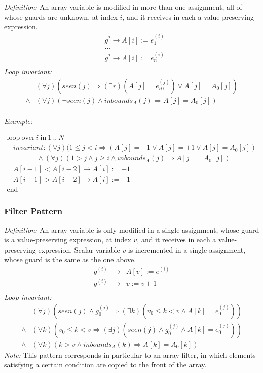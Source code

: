\documentclass[a4paper,10pt]{article}
\newcommand{\idx}{\ensuremath{i}\xspace}
\newcommand{\at}[1]{{(#1)}}
\newcommand{\KWloop}{\ensuremath{\mathrm{loop}~}}
\newcommand{\KWend}{\ensuremath{\mathrm{end}~}}
\newcommand{\KWover}{\ensuremath{\mathrm{over}~}}
\newcommand{\KWin}{\ensuremath{~\mathrm{in}~}}
\newcommand{\impl}{\ensuremath{\Longrightarrow}}
\newcommand{\inbounds}[2]{\ensuremath{\mathit{inbounds}_{#1}(#2)}\xspace}
\newcommand{\seen}[1]{\ensuremath{\mathit{seen}(#1)}\xspace}
\newcommand{\loopinvariant}{\noindent\textit{Loop invariant:}\xspace}
\newcommand{\patterndef}{\noindent\textit{Definition:}\xspace}
\newcommand{\patternexample}{\noindent\textit{Example:}\xspace}
\newcommand{\patternnote}{\noindent\textit{Note:}\xspace}
\begin{document}
\patterndef An array variable is modified in more than one assignment, all
of whose guards are unknown, at index \idx, and it receives in each a
value-preserving expression.
%
\begin{eqnarray*}
&g^? \rightarrow A[\idx] := e_1^\at{\idx}\\
&...\\
&g^? \rightarrow A[\idx] := e_n^\at{\idx}\\
\end{eqnarray*}
%
\loopinvariant
%
\begin{eqnarray*}
&(\forall j)(\seen{j} \impl (\exists r)(A[j] = e_{r0}^\at{j}) \lor A[j] = A_0[j]) \\
\land&
 (\forall j)(\neg \seen{j} \land \inbounds{A}{j} \impl A[j] = A_0[j])\\
\end{eqnarray*}

\bigskip
\patternexample

\medskip
$\begin{array}{l}
  \KWloop \KWover i \KWin 1~..~N \\
  ~~~~ \textit{invariant}: (\forall j)(1 \leq j < i \impl (A[j] = -1 \lor A[j] = +1 \lor A[j] = A_0[j])\\
  ~~~~~~~~~~~~~~~~~~~ \land (\forall j)(1 > j \land j \geq i \land \inbounds{A}{j}\impl A[j] = A_0[j])\\
  ~~~~ A[i-1] < A[i-2] \rightarrow A[i] := -1\\
  ~~~~ A[i-1] > A[i-2] \rightarrow A[i] := +1\\
  \KWend
\end{array}$

\subsubsection*{Filter Pattern}

\patterndef An array variable is only modified in a single assignment, whose
guard is a value-preserving expression, at index $v$, and it receives in each a 
value-preserving expression. Scalar variable $v$ is incremented in a single assignment, 
whose guard is the same as the one above.
%
\begin{eqnarray*}
g^\at{\idx} &\rightarrow& A[v] := e^\at{\idx}\\
g^\at{\idx} &\rightarrow& v := v + 1\\
\end{eqnarray*}
%
\loopinvariant
%
\begin{eqnarray*}
&(\forall j)(\seen{j} \land g_0^\at{j} \impl (\exists k)(v_0 \leq k < v \land A[k] = e_0^\at{j}))  \\
\land&
(\forall k)(v_0 \leq k < v \impl (\exists j)(\seen{j} \land g_0^\at{j} \land A[k] = e_0^\at{j}))  \\
\land&
(\forall k)(k > v \land \inbounds{A}{k} \impl A[k] = A_0[k])
\end{eqnarray*}
%
\patternnote This pattern corresponds in particular to an array filter, in
which elements satisfying a certain condition are copied to the front of the
array.
\end{document}
